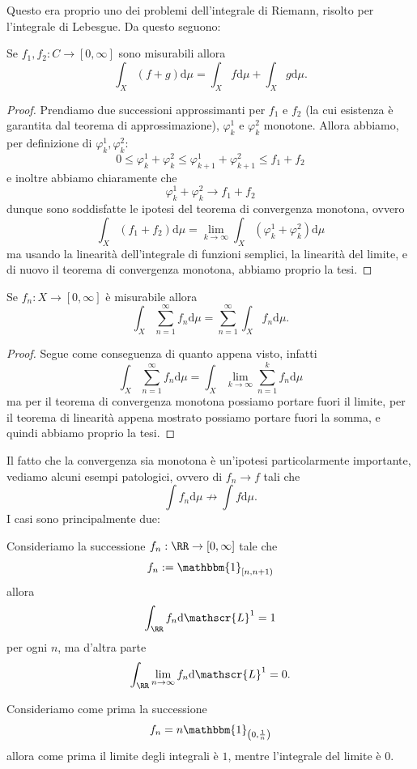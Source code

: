 \documentclass[11pt]{scrartcl}
\newcommand{\dif}{\text{d}}
\begin{document}
	Questo era proprio uno dei problemi dell'integrale di Riemann, risolto per l'integrale di Lebesgue. Da questo seguono:
	\begin{corollary}
		Se $f_1,f_2:C\to [0,\infty]$ sono misurabili allora
		$$\int_X\left(f+g\right)\dif \mu = \int_Xf\dif \mu+\int_Xg\dif \mu.$$
	\end{corollary}
	\begin{proof}
		Prendiamo due successioni approssimanti per $f_1$ e $f_2$ (la cui esistenza è garantita dal teorema di approssimazione), $\varphi^1_k$ e $\varphi_k^2$ monotone. Allora abbiamo, per definizione di $\varphi_k^1,\varphi_k^2$:
		$$0\le \varphi_k^1+\varphi_k^2 \le \varphi_{k+1}^1+\varphi_{k+1}^2 \le f_1+f_2$$
		e inoltre abbiamo chiaramente che 
		$$\varphi^1_k+\varphi^2_k \to f_1+f_2$$
		dunque sono soddisfatte le ipotesi del teorema di convergenza monotona, ovvero
		$$\int_X\left(f_1+f_2\right)\dif \mu =\lim_{k\to\infty}\int_X\left(\varphi_k^1+\varphi_k^2\right)\dif \mu$$
		ma usando la linearità dell'integrale di funzioni semplici, la linearità del limite, e di nuovo il teorema di convergenza monotona, abbiamo proprio la tesi.
	\end{proof}
	\begin{corollary}
		Se $f_n:X\to [0,\infty]$ è misurabile allora
		$$\int_X \sum_{n=1}^{\infty}f_n\dif \mu=\sum_{n=1}^{\infty}\int_X f_n\dif \mu.$$
	\end{corollary}
	\begin{proof}
		Segue come conseguenza di quanto appena visto, infatti
		$$\int_X\sum_{n=1}^{\infty}f_n\dif \mu=\int_X\lim_{k\to\infty}\sum_{n=1}^{k}f_n \dif \mu$$
		ma per il teorema di convergenza monotona possiamo portare fuori il limite, per il teorema di linearità appena mostrato possiamo portare fuori la somma, e quindi abbiamo proprio la tesi.
	\end{proof}
	Il fatto che la convergenza sia monotona è un'ipotesi particolarmente importante, vediamo alcuni esempi patologici, ovvero di $f_n\to f$ tali che
	$$\int f_n \dif \mu \not\to \int f\dif \mu.$$
	I casi sono principalmente due:
	\begin{example}
		Consideriamo la successione $f_n:\RR\to [0,\infty]$ tale che
		$$f_n:= \mathbbm{1}_{[n,n+1)}$$
		allora
		$$\int_\RR f_n\dif \mathscr{L}^1=1$$
		per ogni $n$, ma d'altra parte
		$$\int_\RR \lim_{n\to\infty}f_n\dif \mathscr{L}^1=0.$$
	\end{example}
	\begin{example}
		Consideriamo come prima la successione
		$$f_n=n\mathbbm{1}_{\left(0,\frac{1}{n}\right)}$$
		allora come prima il limite degli integrali è $1$, mentre l'integrale del limite è $0$. 
	\end{example}
\end{document}
